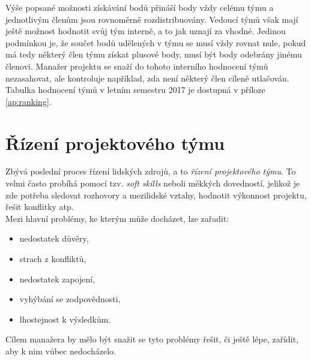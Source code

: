 Výše popsané možnosti získávání bodů přináší body vždy celému týmu a jednotlivým členům jsou rovnoměrně rozdistribuovány. Vedoucí týmů však mají ještě možnost hodnotit svůj tým interně, a to jak uznají za vhodné. Jedinou podmínkou je, že součet bodů udělených v týmu se musí vždy rovnat nule, pokud má tedy některý člen týmu získat plusové body, musí být body odebrány jinému členovi. Manažer projektu se snaží do tohoto interního hodnocení týmů nezasahovat, ale kontroluje například, zda není některý člen cíleně utlačován.\\

Tabulka hodnocení týmů v letním semestru 2017 je dostupná v příloze \ref{ap:ranking}.


\section{Řízení projektového týmu}

Zbývá poslední proces řízení lidských zdrojů, a to \emph{řízení projektového týmu}. To velmi často probíhá pomocí tzv. \emph{soft skills} neboli měkkých dovedností, jelikož je zde potřeba sledovat rozhovory a mezilidské vztahy, hodnotit výkonnost projektu, řešit konflitky atp.\\
Mezi hlavní problémy, ke kterým může docházet, lze zařadit:
\begin{itemize}
	\item nedostatek důvěry,
	\item strach z konfliktů,
	\item nedostatek zapojení,
	\item vyhýbání se zodpovědnosti,
	\item lhostejnost k výsledkům.
\end{itemize}
Cílem manažera by mělo být snažit se tyto problémy řešit, či ještě lépe, zařídit, aby k nim vůbec nedocházelo.

